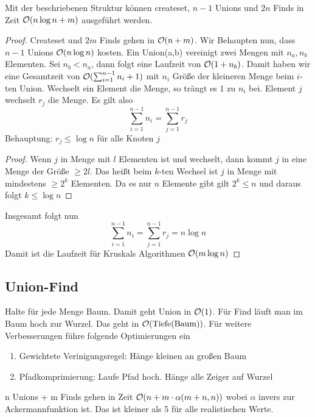 %    
%
            \begin{satz}
                Mit der beschriebenen Struktur können createset, $n-1$ Unions und $2n$ Finds in Zeit $\mathcal{O}(n \log n + m)$ ausgeführt werden.
            \end{satz}        
            
            \begin{proof}
                Createset und $2m$ Finds gehen in $\mathcal{O}(n+m)$. Wir Behaupten nun, dass $n-1$ Unions $\mathcal{O}(n \log n)$ kosten. Ein Union(a,b) vereinigt zwei Mengen mit $n_a, n_b$ Elementen. Sei $n_b < n_a$, dann folgt eine Laufzeit von $\mathcal{O}(1 + n_b)$. Damit haben wir eine Gesamtzeit von $\mathcal{O}(\sum_{i=1}^{n-1}{n_i+1})$ mit $n_i$ Größe der kleineren Menge beim $i$-ten Union. Wechselt ein Element die Menge, so trängt es $1$ zu $n_i$ bei. Element $j$ wechselt $r_j$ die Menge. Es gilt also
                $$
                    \sum_{i=1}^{n-1}{n_i}  = \sum_{j=1}^{n-1}{r_j}
                $$ 
                Behauptung: $r_j \leq \log n$ für alle Knoten $j$
                \begin{proof}
                    Wenn $j$ in Menge mit $l$ Elementen ist und wechselt, dann kommt $j$ in eine Menge der Größe $\geq 2l$. Das heißt beim $k$-ten Wechsel ist $j$ in Menge mit mindestens $\geq 2^k$ Elementen. Da es nur $n$ Elemente gibt gilt $2^k \leq n$ und daraus folgt $k \leq \log n$
                \end{proof}
                Insgesamt folgt nun
                $$
                    \sum_{i=1}^{n-1}{n_i}  = \sum_{j=1}^{n-1}{r_j} = n \log n    
                $$
                Damit ist die Laufzeit für Kruskals Algorithmen $\mathcal{O}(m \log n)$
            \end{proof}
            
    \subsection{Union-Find}
        Halte für jede Menge Baum. Damit geht Union in $\mathcal{O}(1)$. Für Find läuft man im Baum hoch zur Wurzel. Das geht in $\mathcal{O}(\text{Tiefe}(\text{Baum}))$. Für weitere Verbesserungen führe folgende Optimierungen ein
        \begin{enumerate}
            \item Gewichtete Verinigungsregel: Hänge kleinen an großen Baum
            \item Pfadkomprimierung: Laufe Pfad hoch. Hänge alle Zeiger auf Wurzel
        \end{enumerate}   
        \begin{satz}
            n Unions + m Finds gehen in Zeit $\mathcal{O}(n + m \cdot \alpha (m+n,n))$ wobei $\alpha$ invers zur Ackermannfunktion ist. Das ist kleiner als 5 für alle realistischen Werte.
        \end{satz}          
            
